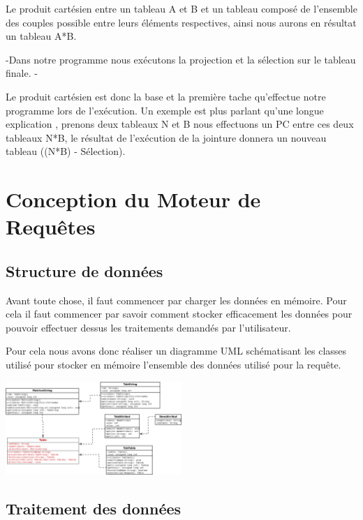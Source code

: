 \documentclass[oneside,13pt,a4paper]{report}
\begin{document}
            Le produit cartésien entre un tableau A et B et un tableau composé de l'ensemble des couples possible entre leurs éléments respectives, ainsi nous aurons en résultat un tableau A*B.

            -Dans notre programme nous exécutons la projection et la sélection sur le tableau finale. -

	        Le produit cartésien est donc la base et la première tache qu’effectue notre programme lors de l’exécution. Un exemple est plus parlant qu'une longue explication , prenons deux tableaux N et B nous effectuons un PC entre ces deux tableaux N*B, le résultat de l’exécution de la jointure donnera un nouveau tableau ((N*B) - Sélection).


    \chapter{Conception du Moteur de Requêtes}

        \section{Structure de données}
            Avant toute chose, il faut commencer par charger les données en mémoire. Pour cela il faut commencer par savoir comment stocker efficacement les données pour pouvoir effectuer dessus les traitements demandés par l’utilisateur.

            Pour cela nous avons donc réaliser un diagramme UML schématisant les classes utilisé pour stocker en mémoire l’ensemble des données utilisé pour la requête.

            \includegraphics[width=0.5\textwidth]{img/sql.png}\par

        \section{Traitement des données}
\end{document}
